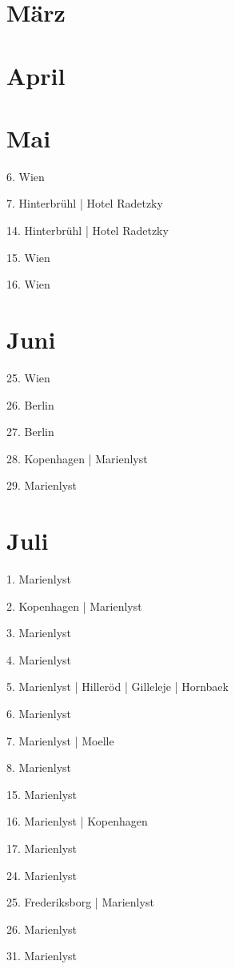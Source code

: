 \documentclass[twoside=false,titlepage=false,open=any, parskip=never, fontsize=10pt, headings=small, chapterprefix=false, appendixprefix=false, DIV=15]{scrbook}
\begin{document}
\begin{multicols}{3}
            \section*{März}
            \section*{April}
            \section*{Mai}
            6. Wien\par
            7. Hinterbrühl | Hotel Radetzky\par
            14. Hinterbrühl | Hotel Radetzky\par
            15. Wien\par
            16. Wien\par
            \section*{Juni}
            25. Wien\par
            26. Berlin\par
            27. Berlin\par
            28. Kopenhagen | Marienlyst\par
            29. Marienlyst\par
            \section*{Juli}
            1. Marienlyst\par
            2. Kopenhagen | Marienlyst\par
            3. Marienlyst\par
            4. Marienlyst\par
            5. Marienlyst | Hilleröd | Gilleleje | Hornbaek\par
            6. Marienlyst\par
            7. Marienlyst | Moelle\par
            8. Marienlyst\par
            15. Marienlyst\par
            16. Marienlyst | Kopenhagen\par
            17. Marienlyst\par
            24. Marienlyst\par
            25. Frederiksborg | Marienlyst\par
            26. Marienlyst\par
            31. Marienlyst\par

\end{multicols}
\end{document}
